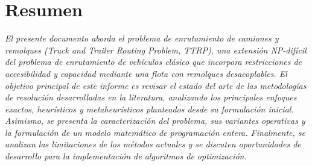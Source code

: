 \begin{abstract}
\noindent
El presente documento aborda el problema de enrutamiento de camiones y remolques (\textit{Truck and Trailer Routing Problem}, TTRP), una extensión NP-difícil del problema de enrutamiento de vehículos clásico que incorpora restricciones de accesibilidad y capacidad mediante una flota con remolques desacoplables. El objetivo principal de este informe es revisar el estado del arte de las metodologías de resolución desarrolladas en la literatura, analizando los principales enfoques exactos, heurísticos y metaheurísticos planteados desde su formulación inicial. Asimismo, se presenta la caracterización del problema, sus variantes operativas y la formulación de un modelo matemático de programación entera. Finalmente, se analizan las limitaciones de los métodos actuales y se discuten oportunidades de desarrollo para la implementación de algoritmos de optimización.
\end{abstract}
\vspace{1.5em}

\section*{Resumen}
\textit{
El presente documento aborda el problema de enrutamiento de camiones y remolques (\textit{Truck and Trailer Routing Problem}, TTRP), una extensión NP-difícil del problema de enrutamiento de vehículos clásico que incorpora restricciones de accesibilidad y capacidad mediante una flota con remolques desacoplables. El objetivo principal de este informe es revisar el estado del arte de las metodologías de resolución desarrolladas en la literatura, analizando los principales enfoques exactos, heurísticos y metaheurísticos planteados desde su formulación inicial. Asimismo, se presenta la caracterización del problema, sus variantes operativas y la formulación de un modelo matemático de programación entera. Finalmente, se analizan las limitaciones de los métodos actuales y se discuten oportunidades de desarrollo para la implementación de algoritmos de optimización.
}
\vspace{1em}
